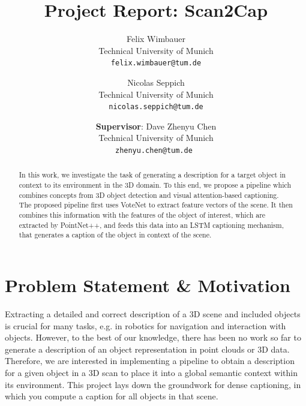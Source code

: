 \documentclass[10pt,twocolumn,letterpaper]{article}
\begin{document}
\title{Project Report: Scan2Cap}

\author{
\small Felix Wimbauer\\
\small Technical University of Munich\\
{\tt\small felix.wimbauer@tum.de}
\and
\small Nicolas Seppich\\
\small Technical University of Munich\\
{\tt\small nicolas.seppich@tum.de}
\and
\small
\textbf{Supervisor}: Dave Zhenyu Chen\\
\small
Technical University of Munich\\
{\tt\small zhenyu.chen@tum.de }
}

\maketitle

\begin{abstract}
In this work, we investigate the task of generating a description for a target object in context to its environment in the 3D domain. To this end, we propose a pipeline which combines concepts from 3D object detection and visual attention-based captioning. The proposed pipeline first uses VoteNet to extract feature vectors of the scene. It then combines this information with the features of the object of interest, which are extracted by PointNet++, and feeds this data into an LSTM captioning mechanism, that generates a caption of the object in context of the scene.
   
\end{abstract}

\section{Problem Statement \& Motivation}

Extracting a detailed and correct description of a 3D scene and included objects is crucial for many tasks, e.g. in robotics for navigation and interaction with objects.
However, to the best of our knowledge, there has been no work so far to generate a description of an object representation in point clouds or 3D data. Therefore, we are interested in implementing a pipeline to obtain a description for a given object in a 3D scan to place it into a global semantic context within its environment. This project lays down the groundwork for dense captioning, in which you compute a caption for all objects in that scene.
 
\end{document}
